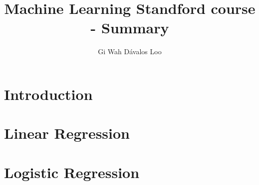 \documentclass[12pt,a4paper]{article}
\title{Machine Learning Standford course - Summary}
\author{Gi Wah Dávalos Loo \textleaf}
\begin{document}
\maketitle


\section{Introduction}


\section{Linear Regression}


\section{Logistic Regression}

\end{document}
